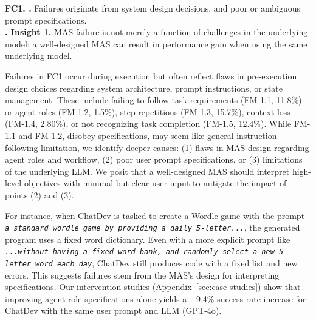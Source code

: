 
\begin{tcolorbox}[colback=berkeleyblue!5!white, colframe=berkeleyblue!100!black, boxrule=0.5mm, left=0.1mm, right=0.1mm, top=0.1mm, bottom=0.1mm]
\textbf{FC1. \fcI.} Failures originate from system design decisions, and poor or ambiguous prompt specifications.\\
\textbf{\faLightbulbO. Insight 1.} MAS failure is not merely a function of challenges in the underlying model; a well-designed MAS can result in performance gain when using the same underlying model.
\end{tcolorbox}
Failures in FC1 occur during execution but often reflect flaws in pre-execution design choices regarding system architecture, prompt instructions, or state management. These include failing to follow task requirements (FM-1.1, 11.8\%) or agent roles (FM-1.2, 1.5\%), step repetitions (FM-1.3, 15.7\%), context loss (FM-1.4, 2.80\%), or not recognizing task completion (FM-1.5, 12.4\%). While FM-1.1 and FM-1.2, disobey specifications, may seem like general instruction-following limitation, we identify deeper causes: (1) flaws in MAS design regarding agent roles and workflow, (2) poor user prompt specifications, or (3) limitations of the underlying LLM. We posit that a well-designed MAS should interpret high-level objectives with minimal but clear user input to mitigate the impact of points (2) and (3).

For instance, when ChatDev is tasked to create a Wordle game with the prompt \texttt{\textit{a standard wordle game by providing a daily 5-letter...}}, the generated program uses a fixed word dictionary. Even with a more explicit prompt like \texttt{\textit{...without having a fixed word bank, and randomly select a new 5-letter word each day}}, ChatDev still produces code with a fixed list and new errors. This suggests failures stem from the MAS's design for interpreting specifications. Our intervention studies (Appendix~\ref{sec:case-studies}) show that improving agent role specifications alone yields a +9.4\% success rate increase for ChatDev with the same user prompt and LLM (GPT-4o).

